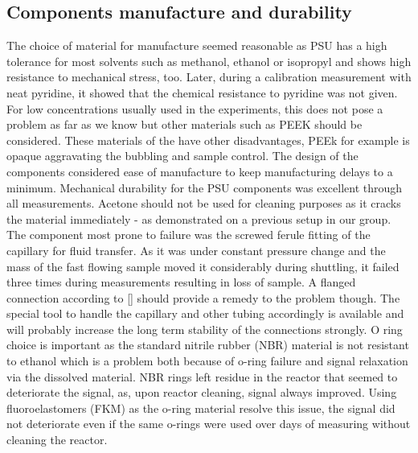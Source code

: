         \subsection{Components manufacture and durability}
        \label{sec:discussion:componentsAndDurability}
            The choice of material for manufacture seemed reasonable as PSU has a high tolerance for most solvents such as methanol, ethanol or isopropyl and shows high resistance to mechanical stress, too. Later, during a calibration measurement with neat pyridine, it showed that the chemical resistance to pyridine was not given. For low concentrations usually used in the experiments, this does not pose a problem as far as we know but other materials such as PEEK should be considered. These materials of the have other disadvantages, PEEk for example is opaque aggravating the bubbling and sample control. The design of the components considered ease of manufacture to keep manufacturing delays to a minimum.
            Mechanical durability for the PSU components was excellent through all measurements. Acetone should not be used for cleaning purposes as it cracks the material immediately - as demonstrated on a previous setup in our group. The component most prone to failure was the screwed ferule fitting of the capillary for fluid transfer. As it was under constant pressure change and the mass of the fast flowing sample moved it considerably during shuttling, it failed three times during measurements resulting in loss of sample. A flanged connection according to \ref{} should provide a remedy to the problem though. The special tool to handle the capillary and other tubing accordingly is available and will probably increase the long term stability of the connections strongly.
            O ring choice is important as the standard nitrile rubber (NBR) material is not resistant to ethanol which is a problem both because of o-ring failure and signal relaxation via the dissolved material. NBR rings left residue in the reactor that seemed to deteriorate the signal, as, upon reactor cleaning, signal always improved. Using fluoroelastomers (FKM) as the o-ring material resolve this issue, the signal did not deteriorate even if the same o-rings were used over days of measuring without cleaning the reactor.
